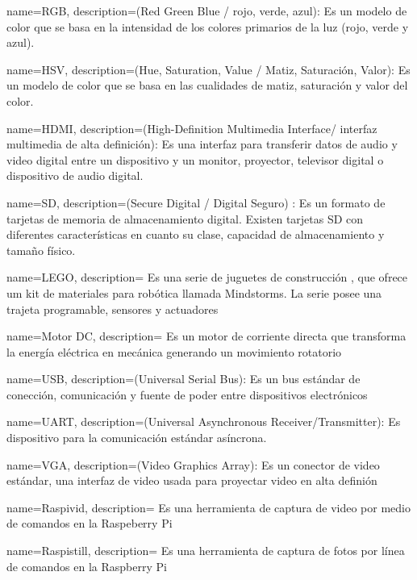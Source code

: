 {
  name=RGB,
  description={(Red Green Blue / rojo, verde, azul): Es un modelo de color que se basa en la intensidad de los colores primarios de la luz (rojo, verde y azul).}
}
  
{
  name=HSV,
  description={(Hue, Saturation, Value / Matiz, Saturación, Valor): Es un modelo de color que se basa en las cualidades de matiz, saturación y valor del color.}
}

{
  name=HDMI,
  description={(High-Definition Multimedia Interface/ interfaz multimedia de alta definición): Es una interfaz para transferir datos de audio y video digital entre un dispositivo y un monitor, proyector, televisor digital o dispositivo de audio digital.}
}

{
  name=SD,
  description={(Secure Digital / Digital Seguro) : Es un formato de tarjetas de memoria de almacenamiento digital. Existen tarjetas SD con diferentes características en cuanto su clase, capacidad de almacenamiento y tamaño físico.}
}  

{
  name=LEGO,
  description={ Es una serie de juguetes de construcci\'on , que ofrece um kit de materiales para rob\'otica llamada Mindstorms. La serie posee una trajeta programable, sensores y actuadores}
}  

{
  name=Motor DC,
  description={ Es un motor de corriente directa que transforma la energ\'ia el\'ectrica en mec\'anica generando un movimiento rotatorio}
}  

{
  name=USB,
  description={(Universal Serial Bus): Es un bus est\'andar de conecci\'on, comunicaci\'on y fuente de poder entre dispositivos electr\'onicos}
}  


{
  name=UART,
  description={(Universal Asynchronous Receiver/Transmitter): Es dispositivo para la comunicaci\'on est\'andar as\'incrona. }
}  

{
  name=VGA,
  description={(Video Graphics Array): Es un conector de video est\'andar, una interfaz de video usada para proyectar video en alta defini\'on }
}  

{
  name=Raspivid,
  description={ Es una herramienta de captura de video por medio de comandos en la Raspeberry Pi}
} 

{
  name=Raspistill,
  description={ Es una herramienta de captura de fotos por l\'inea de comandos en la Raspberry Pi }
} 
